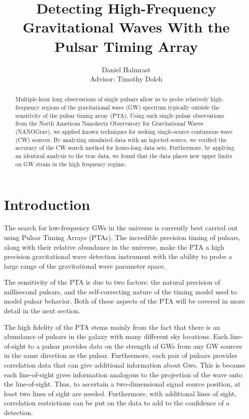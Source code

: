 \documentclass[12pt]{article}
\begin{document}
\bigskip

\title{Detecting High-Frequency Gravitational Waves With the Pulsar Timing Array}
\author{Daniel Halmrast \\ Advisor: Timothy Dolch}
\date{}

\maketitle

\begin{abstract}
Multiple-hour long observations of single pulsars allow us to probe relatively
high-frequency regions of the gravitational wave (GW) spectrum typically outside
the sensitivity of the pulsar timing array (PTA). Using such single pulsar
observations from the North American Nanohertz Observatory for Gravitational
Waves (NANOGrav), we applied known techniques for seeking single-source continuous
wave (CW) sources. By analyzing simulated data with an injected source, we
verified the accuracy of the CW search method for hours-long data sets.
Furthermore, by applying an identical analysis to the true data, we found that
the data places new upper limits on GW strain in the high frequency regime.
\end{abstract}

\section{Introduction}
The search for low-frequency GWs in the universe is currently
best carried out using Pulsar Timing Arrays (PTAs). The incredible precision timing of
pulsars, along with their relative abundance in the universe, make the PTA a
high precision gravitational wave detection instrument with the ability to probe
a large range of the gravitational wave parameter space.

The sensitivity of the PTA is due to two factors: the natural precision of
millisecond pulsars, and the self-correcting nature of the timing model used to
model pulsar behavior. Both of these aspects of the PTA will be covered in more
detail in the next section.

The high fidelity of the PTA stems mainly from the fact that there is an
abundance of pulsars in the galaxy with many different sky locations.
Each line-of-sight to a pulsar provides data on the strength of
GWs from any GW sources in the same direction as the pulsar. Furthermore, each pair of
pulsars provides correlation data that can give additional information about Gws.
This is because each line-of-sight
gives information analogous to the projection of the wave onto the line-of-sight. Thus, to ascertain a two-dimensional signal source position, at least two
lines of sight are needed. Furthermore, with additional lines of sight,
correlation restrictions can be put on the data to add to the confidence of a
detection.
\end{document}
